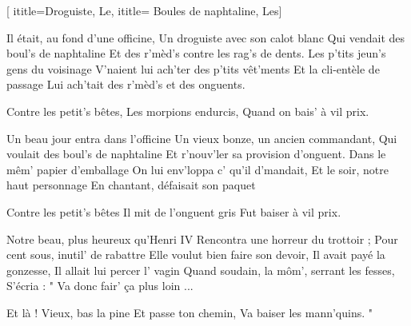 [
ititle={Droguiste, Le},
ititle= {Boules de naphtaline, Les}]


\beginverse
Il était, au fond d'une officine,
Un droguiste avec son calot blanc
Qui vendait des boul's de naphtaline
Et des r'mèd's contre les rag's de dents.
Les p'tits jeun's gens du voisinage
V'naient lui ach'ter des p'tits vêt'ments
Et la cli-entèle de passage
Lui ach'tait des r'mèd's et des onguents.
\endverse

\beginchorus
Contre les petit's bêtes,
Les morpions endurcis,
 {Quand on bais' à vil prix.}
\endchorus

\beginverse
Un beau jour entra dans l'officine
Un vieux bonze, un ancien commandant,
Qui voulait des boul's de naphtaline
Et r'nouv'ler sa provision d'onguent.
Dans le mêm' papier d'emballage
On lui env'loppa c' qu'il d'mandait,
Et le soir, notre haut personnage
En chantant, défaisait son paquet
\endverse

\beginchorus
Contre les petit's bêtes
Il mit de l'onguent gris
 {Fut baiser à vil prix.}
\endchorus

\beginverse
Notre beau, plus heureux qu'Henri IV
Rencontra une horreur du trottoir ;
Pour cent sous, inutil' de rabattre
Elle voulut bien faire son devoir,
Il avait payé la gonzesse,
Il allait lui percer l' vagin
Quand soudain, la môm', serrant les fesses,
S'écria : " Va donc fair' ça plus loin ...
\endverse

\beginchorus
Et là ! Vieux, bas la pine
Et passe ton chemin,
 {Va baiser les mann'quins. "}
\endchorus

\endsong